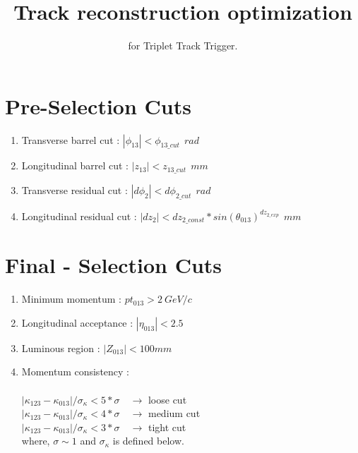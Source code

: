 \documentclass[11pt,a4paper]{article}
\title{Track reconstruction optimization}
\author{for Triplet Track Trigger.}
\date{}
\begin{document}
\maketitle

\section*{Pre-Selection Cuts}

\begin{enumerate}\item Transverse barrel cut : $|\phi_{13}| < \phi_{13 \_ cut}  \: \: rad $ 

\item Longitudinal barrel cut  : $|z_{13}| < z_{13 \_ cut}  \: \: mm$ 
\item Transverse residual cut : $|d\phi_{2}| < d\phi_{2 \_ cut}  \: \: rad$
\item Longitudinal residual cut : $|dz_{2}| <  dz_{2 \_const}* sin(\theta_{013})^{dz_{2 \_exp}} \: \: mm$
\end{enumerate}
\section*{Final - Selection Cuts}
\begin{enumerate}
\item Minimum momentum : $ pt_{013} > 2~ GeV/c$\
\item Longitudinal acceptance : $|\eta_{013}| < 2.5$
\item Luminous region : $|Z_{013}| < 100mm$
\item Momentum consistency : \\\\
$|\kappa_{123} - \kappa_{013}| / \sigma_{\kappa} < 5*\sigma \quad \rightarrow$ loose cut \\
$|\kappa_{123} - \kappa_{013}| / \sigma_{\kappa} < 4*\sigma \quad \rightarrow $ medium cut \\
$|\kappa_{123} - \kappa_{013}| / \sigma_{\kappa} < 3*\sigma \quad \rightarrow$ tight cut \\
where, $\sigma \sim 1 $ and $\sigma_{\kappa}$ is defined below.
\end{enumerate}
\end{document}
